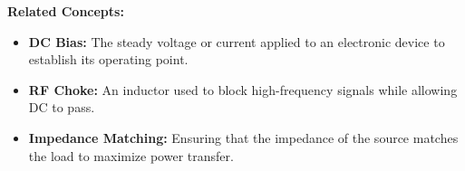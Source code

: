 \noindent\textbf{Related Concepts:}
\begin{itemize}
    \item \textbf{DC Bias:} The steady voltage or current applied to an electronic device to establish its operating point.
    \item \textbf{RF Choke:} An inductor used to block high-frequency signals while allowing DC to pass.
    \item \textbf{Impedance Matching:} Ensuring that the impedance of the source matches the load to maximize power transfer.
\end{itemize}

